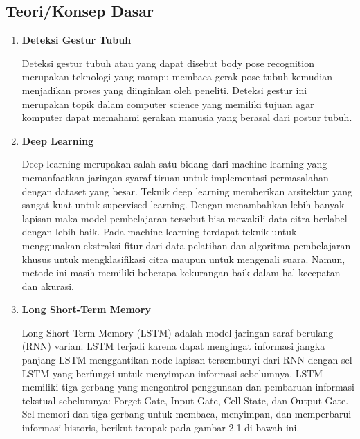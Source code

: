 \subsection{Teori/Konsep Dasar}

\begin{enumerate} [label=\textbf{\arabic*}., listparindent=2em]
  \item \textbf{Deteksi Gestur Tubuh}
  
  Deteksi gestur tubuh atau yang dapat disebut body pose recognition merupakan teknologi yang mampu membaca gerak pose tubuh kemudian menjadikan proses yang diinginkan oleh peneliti. Deteksi gestur ini merupakan topik dalam computer science yang memiliki tujuan agar komputer dapat memahami gerakan manusia yang berasal dari postur tubuh.
  
  \item \textbf{Deep Learning}
  
  Deep learning merupakan salah satu bidang dari machine learning yang memanfaatkan jaringan syaraf tiruan untuk implementasi permasalahan dengan dataset yang besar. Teknik deep learning memberikan arsitektur yang sangat kuat untuk supervised learning. Dengan menambahkan lebih banyak lapisan maka model pembelajaran tersebut bisa mewakili data citra berlabel dengan lebih baik. Pada machine learning terdapat teknik untuk menggunakan ekstraksi fitur dari data pelatihan dan algoritma pembelajaran khusus untuk mengklasifikasi citra maupun untuk mengenali suara. Namun, metode ini masih memiliki beberapa kekurangan baik dalam hal kecepatan dan akurasi.

  \item \textbf{Long Short-Term Memory}
  
  Long Short-Term Memory (LSTM) adalah model jaringan saraf berulang (RNN) varian. LSTM terjadi karena dapat mengingat informasi jangka panjang LSTM menggantikan node lapisan tersembunyi dari RNN dengan sel LSTM yang berfungsi untuk menyimpan informasi sebelumnya. LSTM memiliki tiga gerbang yang mengontrol penggunaan dan pembaruan informasi tekstual sebelumnya: Forget Gate, Input Gate, Cell State, dan Output Gate. Sel memori dan tiga gerbang untuk membaca, menyimpan, dan memperbarui informasi historis, berikut tampak pada gambar 2.1 di bawah ini.


\end{enumerate}
